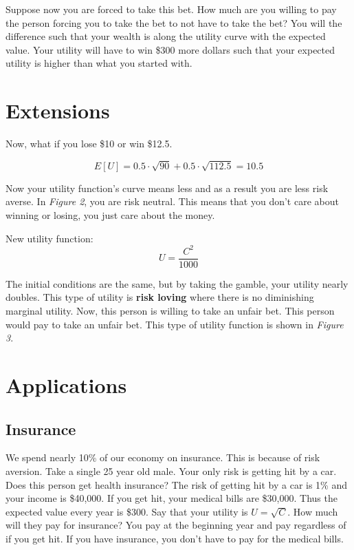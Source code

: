 \documentclass{article}
\begin{document}
Suppose now you are forced to take this bet. How much are you willing to pay the
person forcing you to take the bet to not have to take the bet? You will the
difference such that your wealth is along the utility curve with the expected
value. Your utility will have to win \$300 more dollars such that your expected
utility is higher than what you started with.

\section{Extensions}

Now, what if you lose \$10 or win \$12.5. 

$$E[U] = 0.5 \cdot \sqrt{90} + 0.5 \cdot \sqrt{112.5} = 10.5$$

Now your utility function's curve means less and as a result you are less risk
averse. In \textit{Figure 2}, you are risk neutral. This means that you don't
care about winning or losing, you just care about the money. 

New utility function:
$$U = \frac{C^2}{1000}$$

The initial conditions are the same, but by taking the gamble, your utility
nearly doubles. This type of utility is \textbf{risk loving} where there is no
diminishing marginal utility. Now, this person is willing to take an unfair bet.
This person would pay to take an unfair bet. This type of utility function is
shown in \textit{Figure 3}. 

\section{Applications}

\subsection{Insurance}

We spend nearly 10\% of our economy on insurance. This is because of risk
aversion. Take a single 25 year old male. Your only risk is getting hit by a
car. Does this person get health insurance? The risk of getting hit by a car is
1\% and your income is \$40,000. If you get hit, your medical bills are
\$30,000. Thus the expected value every year is \$300. Say that your utility is
$U=\sqrt{C}$. How much will they pay for insurance? You pay at the beginning
year and pay regardless of if you get hit. If you have insurance, you don't have
to pay for the medical bills. 
\end{document}
